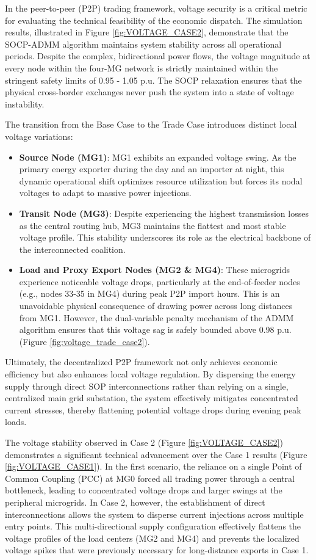 \documentclass[preprint,12pt]{elsarticle}
\begin{document}
    In the peer-to-peer (P2P) trading framework, voltage security is a critical metric for evaluating the technical feasibility of the economic dispatch. The simulation results, illustrated in Figure \ref{fig:VOLTAGE_CASE2}, demonstrate that the SOCP-ADMM algorithm maintains system stability across all operational periods. Despite the complex, bidirectional power flows, the voltage magnitude at every node within the four-MG network is strictly maintained within the stringent safety limits of 0.95 - 1.05 p.u. The SOCP relaxation ensures that the physical cross-border exchanges never push the system into a state of voltage instability.

    The transition from the Base Case to the Trade Case introduces distinct local voltage variations:
    \begin{itemize}
        \item \textbf{Source Node (MG1)}: MG1 exhibits an expanded voltage swing. As the primary energy exporter during the day and an importer at night, this dynamic operational shift optimizes resource utilization but forces its nodal voltages to adapt to massive power injections.
        \item \textbf{Transit Node (MG3)}: Despite experiencing the highest transmission losses as the central routing hub, MG3 maintains the flattest and most stable voltage profile. This stability underscores its role as the electrical backbone of the interconnected coalition.
        \item \textbf{Load and Proxy Export Nodes (MG2 \& MG4)}: These microgrids experience noticeable voltage drops, particularly at the end-of-feeder nodes (e.g., nodes 33-35 in MG4) during peak P2P import hours. This is an unavoidable physical consequence of drawing power across long distances from MG1. However, the dual-variable penalty mechanism of the ADMM algorithm ensures that this voltage sag is safely bounded above 0.98 p.u. (Figure \ref{fig:voltage_trade_case2}).
    \end{itemize}

    Ultimately, the decentralized P2P framework not only achieves economic efficiency but also enhances local voltage regulation. By dispersing the energy supply through direct SOP interconnections rather than relying on a single, centralized main grid substation, the system effectively mitigates concentrated current stresses, thereby flattening potential voltage drops during evening peak loads.

    The voltage stability observed in Case 2 (Figure \ref{fig:VOLTAGE_CASE2}) demonstrates a significant technical advancement over the Case 1 results (Figure \ref{fig:VOLTAGE_CASE1}). In the first scenario, the reliance on a single Point of Common Coupling (PCC) at MG0 forced all trading power through a central bottleneck, leading to concentrated voltage drops and larger swings at the peripheral microgrids. In Case 2, however, the establishment of direct interconnections allows the system to disperse current injections across multiple entry points. This multi-directional supply configuration effectively flattens the voltage profiles of the load centers (MG2 and MG4) and prevents the localized voltage spikes that were previously necessary for long-distance exports in Case 1.
\end{document}
